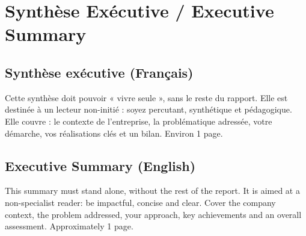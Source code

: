 \section{Synthèse Exécutive / Executive Summary}

\subsection*{Synthèse exécutive (Français)}

\begin{guideline}
Cette synthèse doit pouvoir « vivre seule », sans le reste du rapport.
Elle est destinée à un lecteur non-initié : soyez percutant, synthétique
et pédagogique. Elle couvre : le contexte de l'entreprise, la
problématique adressée, votre démarche, vos réalisations clés et un
bilan. Environ 1 page.
\end{guideline}


\vspace{1cm}

\subsection*{Executive Summary (English)}

\begin{guideline}
This summary must stand alone, without the rest of the report. It is
aimed at a non-specialist reader: be impactful, concise and clear. Cover
the company context, the problem addressed, your approach, key
achievements and an overall assessment. Approximately 1 page.
\end{guideline}

